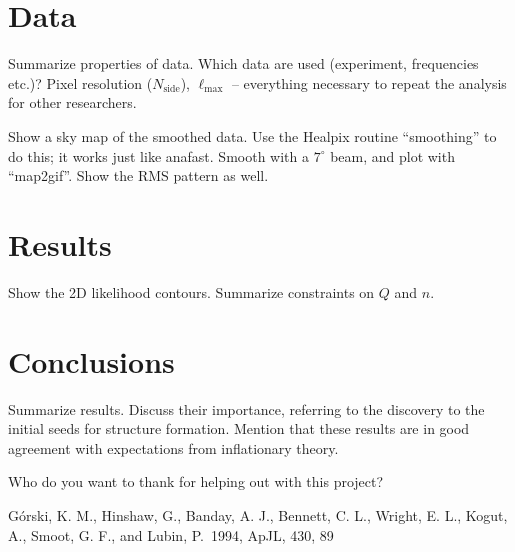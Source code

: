 \documentclass{emulateapj}
\begin{document}
\section{Data}
\label{sec:data}

Summarize properties of data. Which data are used (experiment,
frequencies etc.)? Pixel resolution ($N_{\textrm{side}}$),
$\ell_{\textrm{max}}$ -- everything necessary to repeat the analysis
for other researchers.

Show a sky map of the smoothed data. Use the Healpix routine
``smoothing'' to do this; it works just like anafast. Smooth with a
$7^{\circ}$ beam, and plot with ``map2gif''. Show the RMS pattern as
well. 

\section{Results}
\label{sec:results}


Show the 2D likelihood contours. Summarize constraints on $Q$ and
$n$. 


\section{Conclusions}
\label{sec:conclusions}

Summarize results. Discuss their importance, referring to the
discovery to the initial seeds for structure formation. Mention that
these results are in good agreement with expectations from
inflationary theory.



%
%


%



\begin{acknowledgements}
  Who do you want to thank for helping out with this project?
\end{acknowledgements}

\begin{thebibliography}{}

 G{\'o}rski, K. M.,
  Hinshaw, G., Banday, A. J., Bennett, C. L., Wright, E. L., Kogut,
  A., Smoot, G. F., and Lubin, P.\ 1994, ApJL, 430, 89

\end{thebibliography}
\end{document}

